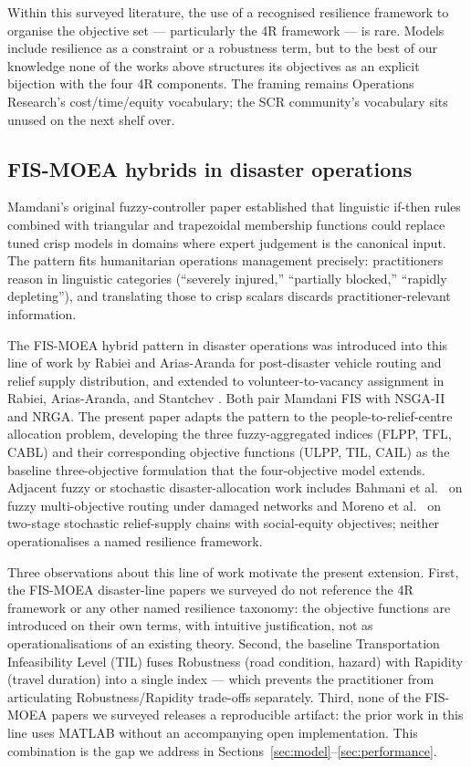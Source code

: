 \documentclass[applsci,article,submit,moreauthors,pdftex]{Definitions/mdpi}
\begin{document}
Within this surveyed literature, the use of a recognised resilience
framework to organise the objective set --- particularly the 4R framework
\cite{bruneau2003} --- is rare. Models include resilience as a constraint
or a robustness term, but to the best of our knowledge none of the works
above structures its objectives as an explicit bijection with the four 4R
components. The framing remains Operations
Research's cost/time/equity vocabulary; the SCR community's vocabulary sits
unused on the next shelf over.

\subsection{FIS-MOEA hybrids in disaster operations}\label{sec:related-fis}

Mamdani's original fuzzy-controller paper \cite{mamdani1975} established
that linguistic if-then rules combined with triangular and trapezoidal
membership functions could replace tuned crisp models in domains where
expert judgement is the canonical input. The pattern fits humanitarian
operations management precisely: practitioners reason in linguistic
categories (``severely injured,'' ``partially blocked,'' ``rapidly
depleting''), and translating those to crisp scalars discards
practitioner-relevant information.

The FIS-MOEA hybrid pattern in disaster operations was introduced into
this line of work by Rabiei and Arias-Aranda \cite{rabiei2021} for
post-disaster vehicle routing and relief supply distribution, and extended
to volunteer-to-vacancy assignment in Rabiei, Arias-Aranda, and Stantchev
\cite{rabiei2023}. Both pair Mamdani FIS with NSGA-II and NRGA. The present
paper adapts the pattern to the people-to-relief-centre allocation problem,
developing the three fuzzy-aggregated indices (FLPP, TFL, CABL) and their
corresponding objective functions (ULPP, TIL, CAIL) as the baseline
three-objective formulation that the four-objective model extends. Adjacent fuzzy or stochastic disaster-allocation work
includes Bahmani et al.\ \cite{bahmani2018} on fuzzy multi-objective
routing under damaged networks and Moreno et al.\ \cite{moreno2018} on
two-stage stochastic relief-supply chains with social-equity
objectives; neither operationalises a named resilience framework.

Three observations about this line of work motivate the present extension.
First, the FIS-MOEA disaster-line papers we surveyed do not reference the
4R framework or any other named resilience taxonomy: the objective
functions are introduced on their own terms, with intuitive
justification, not as operationalisations of an existing theory. Second,
the baseline Transportation Infeasibility Level (TIL) fuses
Robustness (road condition, hazard) with Rapidity (travel duration) into
a single index --- which prevents the practitioner from articulating
Robustness/Rapidity trade-offs separately. Third, none of the FIS-MOEA
papers we surveyed releases a reproducible artifact: the prior work in
this line uses MATLAB without an accompanying open implementation. This combination
is the gap we address in Sections~\ref{sec:model}--\ref{sec:performance}.
\end{document}
